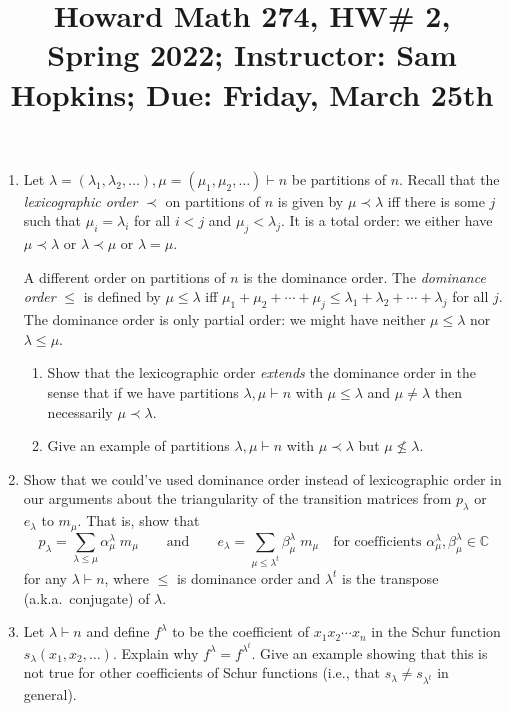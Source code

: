 \documentclass[11pt]{article}
\title{Howard Math 274, HW\# 2, \\ {\normalsize Spring 2022; Instructor: Sam Hopkins; Due: Friday, March 25th}}
\date{}
\begin{document}
\maketitle

\thispagestyle{empty}

\vspace{-1.5cm}

\begin{enumerate}

\item Let $\lambda=(\lambda_1,\lambda_2,\ldots), \mu=(\mu_1,\mu_2,\ldots) \vdash n$ be partitions of $n$. Recall that the \emph{lexicographic order} $\prec$ on partitions of $n$ is given by $\mu \prec \lambda$ iff there is some $j$ such that $\mu_i=\lambda_i$ for all $i < j$ and $\mu_j < \lambda_j$. It is a total order: we either have $\mu \prec \lambda$ or $\lambda \prec \mu$ or $\lambda = \mu$.

A different order on partitions of $n$ is the dominance order. The \emph{dominance order} $\leq$ is defined by $\mu \leq \lambda$ iff $\mu_1 + \mu_2 + \cdots + \mu_j \leq \lambda_1 + \lambda_2 + \cdots + \lambda_j$ for all $j$. The dominance order is only partial order: we might have neither $\mu \leq \lambda$ nor $\lambda \leq \mu$.

\begin{enumerate}
\item Show that the lexicographic order \emph{extends} the dominance order in the sense that if we have partitions $\lambda, \mu \vdash n$ with $\mu \leq \lambda$ and $\mu \neq \lambda$ then necessarily $\mu \prec \lambda$.
\item Give an example of partitions $\lambda,\mu \vdash n$ with $\mu \prec \lambda$ but $\mu \not \leq \lambda$.
\end{enumerate}

\item Show that we could've used dominance order instead of lexicographic order in our arguments about the triangularity of the transition matrices from $p_{\lambda}$ or $e_{\lambda}$ to $m_{\mu}$. That is, show that
\[ p_{\lambda} = \sum_{\lambda \leq \mu} \alpha^{\lambda}_{\mu} \; m_{\mu} \qquad \textrm{and} \qquad e_{\lambda} = \sum_{\mu \leq \lambda^t} \beta^{\lambda}_{\mu} \; m_{\mu} \quad \textrm{for coefficients $\alpha^{\lambda}_{\mu},\beta^{\lambda}_{\mu}\in\mathbb{C}$}\]
for any $\lambda \vdash n$, where $\leq$ is dominance order and $\lambda^t$ is the transpose (a.k.a.~conjugate) of $\lambda$.

\item Let $\lambda \vdash n$ and define $f^{\lambda}$ to be the coefficient of $x_1x_2\cdots x_n$ in the Schur function $s_{\lambda}(x_1,x_2,\ldots)$. Explain why $f^{\lambda} = f^{\lambda^t}$. Give an example showing that this is not true for other coefficients of Schur functions (i.e., that $s_{\lambda} \neq s_{\lambda^t}$ in general).


\end{enumerate}
\end{document}
